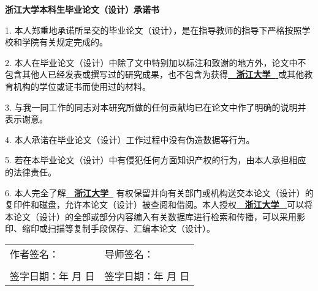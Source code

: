 \begin{center}
    \sanhao \bfseries
    \fangsong
    浙江大学本科生毕业论文（设计）承诺书
\end{center}

\fangsong \sihao \linespread{2}\selectfont

1. 本人郑重地承诺所呈交的毕业论文（设计），是在指导教师的指导下严格按照学校和学院有关规定完成的。

2. 本人在毕业论文（设计）中除了文中特别加以标注和致谢的地方外，论文中不包含其他人已经发表或撰写过的研究成果，也不包含为获得\underline{\textbf{~ 浙江大学~ }}或其他教育机构的学位或证书而使用过的材料。

3. 与我一同工作的同志对本研究所做的任何贡献均已在论文中作了明确的说明并表示谢意。

4. 本人承诺在毕业论文（设计）工作过程中没有伪造数据等行为。

5. 若在本毕业论文（设计）中有侵犯任何方面知识产权的行为，由本人承担相应的法律责任。

6. 本人完全了解\underline{\textbf{~ 浙江大学~}} 有权保留并向有关部门或机构送交本论文（设计）的复印件和磁盘，允许本论文（设计）被查阅和借阅。本人授权\underline{\textbf{~ 浙江大学~ }}可以将本论文（设计）的全部或部分内容编入有关数据库进行检索和传播，可以采用影印、缩印或扫描等复制手段保存、汇编本论文（设计）。

\vfill


\noindent\begin{tabularx}{\linewidth}{XX}
    作者签名：                           & 导师签名：                           \\
                                    &                                 \\
    签字日期：\qquad 年 \qquad 月 \qquad 日 & 签字日期：\qquad 年 \qquad 月 \qquad 日
\end{tabularx}

\vspace{2em}

\thispagestyle{bodypage}






